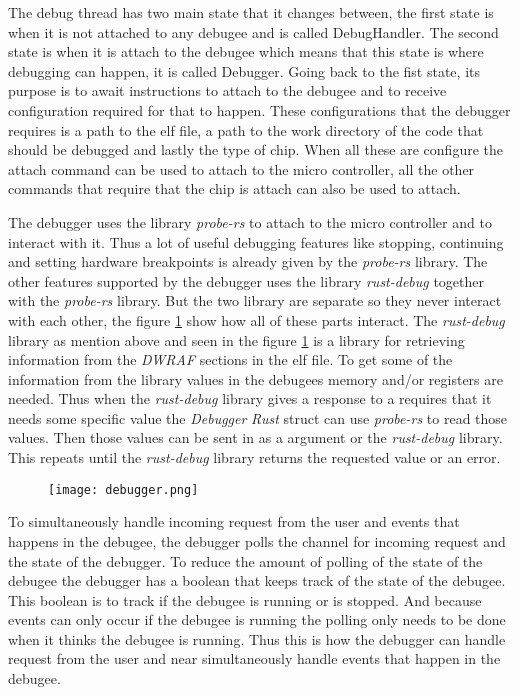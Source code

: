 
The debug thread has two main state that it changes between, the first state is when it is not attached to any \gls{debugee} and is called DebugHandler.
The second state is when it is attach to the \gls{debugee} which means that this state is where debugging can happen, it is called Debugger.
Going back to the fist state, its purpose is to await instructions to attach to the \gls{debugee} and to receive configuration required for that to happen.
These configurations that the debugger requires is a path to the elf file, a path to the work directory of the code that should be debugged and lastly the type of chip.
When all these are configure the attach command can be used to attach to the micro controller, all the other commands that require that the chip is attach can also be used to attach.


The debugger uses the library \emph{probe-rs} \cite{probe} to attach to the micro controller and to interact with it.
Thus a lot of useful debugging features like stopping, continuing and setting hardware breakpoints is already given by the \emph{probe-rs} library.
The other features supported by the debugger uses the library \emph{rust-debug} together with the \emph{probe-rs} library.
But the two library are separate so they never interact with each other, the figure \ref{fig:debugger} show how all of these parts interact.
The \emph{rust-debug} library as mention above and seen in the figure \ref{fig:debugger} is a library for retrieving information from the \emph{DWRAF} sections in the \gls{elf} file.
To get some of the information from the library values in the \glspl{debugee} memory and/or registers are needed.
Thus when the \emph{rust-debug} library gives a response to a requires that it needs some specific value the \emph{Debugger} \emph{Rust} struct can use \emph{probe-rs} to read those values.
Then those values can be sent in as a argument or the \emph{rust-debug} library.
This repeats until the \emph{rust-debug} library returns the requested value or an error.


\begin{figure}[h]
    \centering
    \texttt{[image: debugger.png]}
    \label{fig:debugger}
\end{figure}


To simultaneously handle incoming request from the user and events that happens in the \gls{debugee}, the debugger polls the channel for incoming request and the state of the debugger.
To reduce the amount of polling of the state of the \gls{debugee} the debugger has a boolean that keeps track of the state of the \gls{debugee}.
This boolean is to track if the \gls{debugee} is running or is stopped.
And because events can only occur if the \gls{debugee} is running the polling only needs to be done when it thinks the \gls{debugee} is running.
Thus this is how the debugger can handle request from the user and near simultaneously handle events that happen in the \gls{debugee}.


